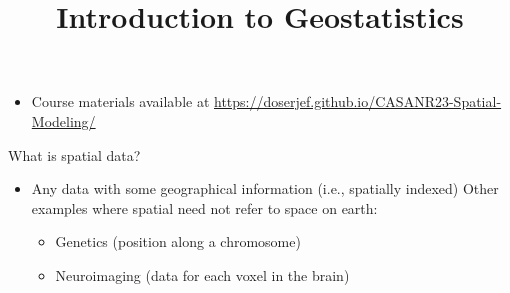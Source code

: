 



\title[]{Introduction to Geostatistics}




\maketitle

\begin{frame}[plain]
\begin{itemize}
\item Course materials available at \href{https://doserjef.github.io/CASANR23-Spatial-Modeling/}{https://doserjef.github.io/CASANR23-Spatial-Modeling/}
\end{itemize}
\end{frame}


\begin{frame}{What is spatial data?}
	\begin{itemize}
		\item Any data with some geographical information (i.e., spatially indexed)
			\pause\myitem Other examples where spatial need not refer to space on earth:
			\begin{itemize}
                                \item Genetics (position along a chromosome)
				\item Neuroimaging (data for each voxel in the brain)
			\end{itemize}
	\end{itemize}
\end{frame}

